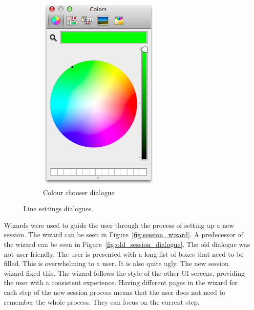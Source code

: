 \begin{figure}[h!]
\begin{subfigure}[b]{0.3\textwidth}
        \includegraphics[width=\textwidth]{images/colour_selector.png}
        \caption{Colour chooser dialogue}
        \label{fig:colour_picker}
    \end{subfigure}
    \caption{Line settings dialogues.}
    \label{fig:line_settings}
\end{figure}

Wizards were used to guide the user through the process of setting up a new session.  The wizard can be seen in Figure~\ref{fig:session_wizard}.  A predecessor of the wizard can be seen in Figure~\ref{fig:old_session_dialogue}.  The old dialogue was not user friendly.  The user is presented with a long list of boxes that need to be filled.  This is overwhelming to a user.  It is also quite ugly.  The new session wizard fixed this.  The wizard follows the style of the other \ac{UI} screens, providing the user with a consistent experience.  Having different pages in the wizard for each step of the new session process means that the user does not need to remember the whole process.  They can focus on the current step.

